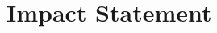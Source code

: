 \chapter*{Impact Statement}
\begin{comment}
How the brain works has long been one of the great mysteries facing mankind, with every step on the way to understanding potentially helping us to know why we behave in the ways we do. Further, if we can understand how the brain works, then we can understand how and why things go wrong in diseases such as \ac{MS} and how we can go about preventing and treating it.


One of the most prominent modern tools for investigating the brain is \ac{MRI} and in particular diffusion \ac{MRI} \acused{dMRI}(\acs{dMRI}) which is sensitive to how water moves inside tissues.
This means that if we can understand how the structure of tissues affects the way that water moves within them, then we can potentially extract information about that structure from the \ac{dMRI} signal.

Since \ac{dMRI} was first proposed as a tool to measure information on the structure of brain tissues, thousands of works have been produced looking to develop and improve techniques and find interesting use cases for them.
One thing common to many of these techniques, however, is that they're based on and validated in models which simplify the structure of the tissue, for instance representing axonal fibres in \ac{WM} as straight cylinders.
We know from electron microscopy studies that real axons are much more complex that this, with wobbly, bulgy shapes that make it very difficult to understand how the \ac{dMRI} signal will behave.

The focus of this thesis is the development of a new tool to generate realistic synthetic \ac{WM} phantoms which we can use in simulation experiments to test and develop existing and new \ac{dMRI} models. This tool, which we call \acused{ConFiG}\acs{ConFiG}, enables us to generate synthetic models of white matter that are more realistic than previously achievable, opening a door into investigation of the \ac{dMRI} process in more detail than ever before.


\end{comment}
